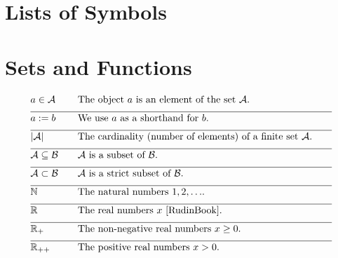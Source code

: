 
\section*{Lists of Symbols}

\vspace*{-2mm}
\section*{Sets and Functions} 

\begin{align} 
	&a \in \mathcal{A} & \quad & \parbox{.75\textwidth}{The object $a$ is an element of the set $\mathcal{A}$.} \nonumber \\[2mm] \hline \nonumber\\[-5mm]
	&a \defeq b & \quad & \mbox{We use $a$ as a shorthand for $b$. }\nonumber \\[2mm] \hline \nonumber\\[-5mm]
	&|\mathcal{A}| & \quad & \mbox{The cardinality (number of elements) of a finite set $\mathcal{A}$.}\nonumber \\[2mm] \hline \nonumber\\[-5mm]
	&\mathcal{A} \subseteq \mathcal{B}& \quad & \mbox{$\mathcal{A}$ is a subset of $\mathcal{B}$.}\nonumber \\[2mm] \hline \nonumber\\[-5mm]
	&\mathcal{A} \subset \mathcal{B}& \quad & \mbox{$\mathcal{A}$ is a strict subset of $\mathcal{B}$.} \nonumber \\[2mm] \hline \nonumber\\[-5mm]
	&\mathbb{N} & \quad & \mbox{The natural numbers $1,2,\ldots$.}\nonumber \\[2mm] \hline \nonumber\\[-5mm]
	&\mathbb{R}  &\quad &\mbox{The real numbers $x$ \cite{RudinBook}.} \nonumber \\[2mm] \hline \nonumber\\[-5mm]
	&\mathbb{R}_{+}  &\quad &\mbox{The non-negative real numbers $x\geq0$.}\nonumber \\[2mm] \hline \nonumber\\[-5mm]
	&\mathbb{R}_{++}  &\quad &\mbox{The positive real numbers $x> 0$.} \nonumber
\end{align} 

